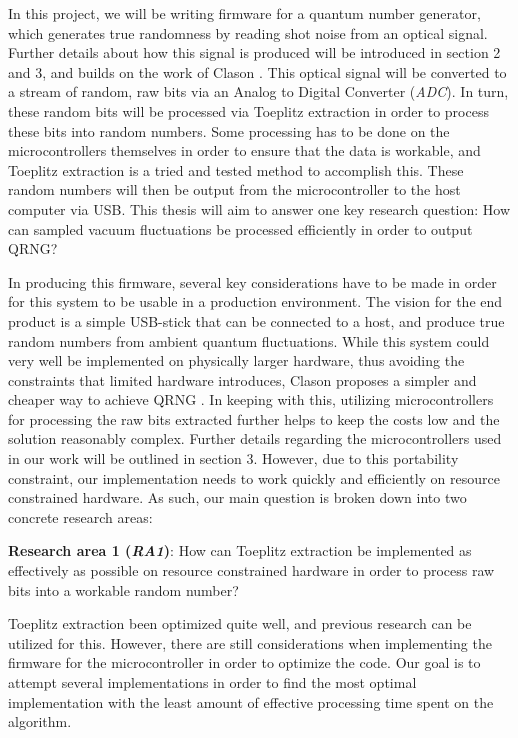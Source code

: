 In this project, we will be writing firmware for a quantum number generator, which generates true randomness by reading shot noise from an optical signal. Further details about how this signal is produced will be introduced in section 2 and 3, and builds on the work of Clason \cite{Clason2023}. This optical signal will be converted to a stream of random, raw bits via an Analog to Digital Converter (\emph{ADC}). In turn, these random bits will be processed via Toeplitz extraction \cite{toeplitz} in order to process these bits into random numbers. Some processing has to be done on the microcontrollers themselves in order to ensure that the data is workable, and Toeplitz extraction is a tried and tested method to accomplish this. These random numbers will then be output from the microcontroller to the host computer via USB. This thesis will aim to answer one key research question: How can sampled vacuum fluctuations be processed efficiently in order to output QRNG?

In producing this firmware, several key considerations have to be made in order for this system to be usable in a production environment. The vision for the end product is a simple USB-stick that can be connected to a host, and produce true random numbers from ambient quantum fluctuations. While this system could very well be implemented on physically larger hardware, thus avoiding the constraints that limited hardware introduces, Clason proposes a simpler and cheaper way to achieve QRNG \cite{Clason2023}. In keeping with this, utilizing microcontrollers for processing the raw bits extracted further helps to keep the costs low and the solution reasonably complex. Further details regarding the microcontrollers used in our work will be outlined in section 3. However, due to this portability constraint, our implementation needs to work quickly and efficiently on resource constrained hardware. As such, our main question is broken down into two concrete research areas:

\textbf{Research area 1 (\emph{RA1})}: How can Toeplitz extraction be implemented as effectively as possible on resource constrained hardware in order to process raw bits into a workable random number?

Toeplitz extraction been optimized quite well, and previous research can be utilized for this. However, there are still considerations when implementing the firmware for the microcontroller in order to optimize the code. Our goal is to attempt several implementations in order to find the most optimal implementation with the least amount of effective processing time spent on the algorithm.


